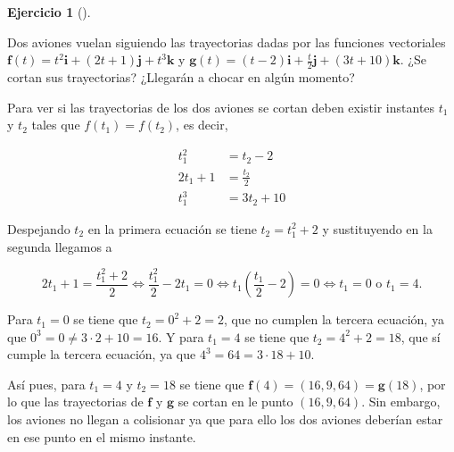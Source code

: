 \documentclass[
  a4paper,
]{scrreport}
\theoremstyle{definition}
\newtheorem{exercise}{Ejercicio}[chapter]
\theoremstyle{remark}
\begin{document}
\begin{exercise}[]\protect\hypertarget{exr-intersección-trayectorias}{}\label{exr-intersección-trayectorias}

Dos aviones vuelan siguiendo las trayectorias dadas por las funciones
vectoriales
\(\mathbf{f}(t)=t^2\mathbf{i}+(2t+1)\mathbf{j}+t^3\mathbf{k}\) y
\(\mathbf{g}(t)=(t-2)\mathbf{i}+\frac{t}{2}\mathbf{j}+(3t+10)\mathbf{k}\).
¿Se cortan sus trayectorias? ¿Llegarán a chocar en algún momento?

\end{exercise}

\begin{tcolorbox}[enhanced jigsaw, coltitle=black, toptitle=1mm, colframe=quarto-callout-tip-color-frame, colbacktitle=quarto-callout-tip-color!10!white, breakable, opacityback=0, bottomtitle=1mm, opacitybacktitle=0.6, title=\textcolor{quarto-callout-tip-color}{\faLightbulb}\hspace{0.5em}{Solución}, arc=.35mm, leftrule=.75mm, toprule=.15mm, titlerule=0mm, bottomrule=.15mm, left=2mm, rightrule=.15mm, colback=white]

Para ver si las trayectorias de los dos aviones se cortan deben existir
instantes \(t_1\) y \(t_2\) tales que \(f(t_1)=f(t_2)\), es decir,

\begin{align*}
t_1^2 &= t_2-2\\
2t_1+1 &= \frac{t_2}{2}\\
t_1^3 &= 3t_2+10
\end{align*}

Despejando \(t_2\) en la primera ecuación se tiene \(t_2 = t_1^2+2\) y
sustituyendo en la segunda llegamos a

\[
2t_1 + 1 = \frac{t_1^2+2}{2} \Leftrightarrow \frac{t_1^2}{2}-2t_1 = 0 \Leftrightarrow t_1\left(\frac{t_1}{2}-2\right)=0 \Leftrightarrow t_1 = 0 \mbox{ o } t_1 = 4.
\]

Para \(t_1=0\) se tiene que \(t_2 = 0^2+2 = 2\), que no cumplen la
tercera ecuación, ya que \(0^3=0\neq 3\cdot 2 +10 =16\). Y para
\(t_1=4\) se tiene que \(t_2=4^2+2=18\), que sí cumple la tercera
ecuación, ya que \(4^3 = 64 = 3\cdot 18 + 10\).

Así pues, para \(t_1=4\) y \(t_2=18\) se tiene que
\(\mathbf{f}(4) = (16, 9, 64) = \mathbf{g}(18)\), por lo que las
trayectorias de \(\mathbf{f}\) y \(\mathbf{g}\) se cortan en le punto
\((16, 9, 64)\). Sin embargo, los aviones no llegan a colisionar ya que
para ello los dos aviones deberían estar en ese punto en el mismo
instante.

\end{tcolorbox}
\end{document}
